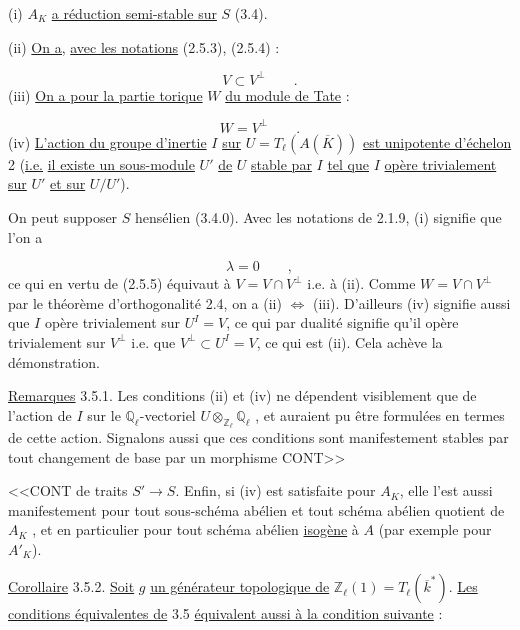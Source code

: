 (i) $A_K$ \underline{a réduction semi-stable sur} $S$ (3.4).

(ii) \underline{On a,} \underline{avec les notations} (2.5.3), (2.5.4) :

\begin{equation*}
V \subset V^{\perp} \qquad .
\end{equation*}
(iii) \underline{On a pour la partie torique} $W$ \underline{du module de Tate} :

\begin{equation*}
W = V^{\perp} \qquad .
\end{equation*}
(iv) \underline{L'action du groupe d'inertie} $I$ \underline{sur} $U = T_{\ell}(A(\overline{K}))$ \underline{est unipotente d'échelon} 2 (\underline{i.e.} \underline{il existe un sous-module} $U'$ \underline{de} $U$ \underline{stable par} $I$ \underline{tel que} $I$ \underline{opère trivialement sur} $U'$ \underline{et sur} $U/U'$).

On peut supposer $S$ hensélien (3.4.0). Avec les notations de 2.1.9, (i) signifie que l'on a

\begin{equation*}
\lambda = 0 \qquad ,
\end{equation*}
ce qui en vertu de (2.5.5) équivaut à $V = V \cap V^{\perp}$ i.e. à (ii). Comme $W=V\cap V^{\perp}$ par le théorème d'orthogonalité 2.4, on a (ii) $\Longleftrightarrow$ (iii). D'ailleurs (iv) signifie aussi que $I$ opère trivialement sur $U^{I} = V$, ce qui par dualité signifie qu'il opère trivialement sur $V^{\perp}$ i.e. que $V^{\perp} \subset U^{I}=V$, ce qui est (ii). Cela achève la démonstration.

\underline{Remarques} 3.5.1. Les conditions (ii) et (iv) ne dépendent visiblement que de l'action de $I$ sur le $\mathbb{Q}_{\ell}$-vectoriel $U \otimes_{\mathbb{Z}_{\ell}} \mathbb{Q}_{\ell}$ , et auraient pu être formulées en termes de cette action. Signalons aussi que ces conditions sont manifestement stables par tout changement de base par un morphisme CONT>>



<<CONT de traits $S' \longrightarrow S$. Enfin, si (iv) est satisfaite pour $A_K$, elle l'est aussi manifestement pour tout sous-schéma abélien et tout schéma abélien quotient de $A_K$ , et en particulier pour tout schéma abélien \underline{isogène} à $A$ (par exemple pour $A'_K$).

\underline{Corollaire} 3.5.2. \underline{Soit} $g$ \underline{un générateur topologique de} $\mathbb{Z}_\ell(1) = T_\ell(\overline{k}^*)$. \underline{Les conditions équivalentes de} 3.5 \underline{équivalent aussi à la condition suivante} :

